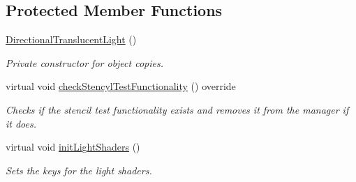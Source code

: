 \subsection*{Protected Member Functions}
\begin{DoxyCompactItemize}
\item 
\mbox{\label{class_geometry_engine_1_1_geometry_world_item_1_1_geometry_light_1_1_directional_translucent_light_a1814d77e9a240ad3492212f7397ebec2}} 
\mbox{\hyperlink{class_geometry_engine_1_1_geometry_world_item_1_1_geometry_light_1_1_directional_translucent_light_a1814d77e9a240ad3492212f7397ebec2}{Directional\+Translucent\+Light}} ()
\begin{DoxyCompactList}\small\item\em Private constructor for object copies. \end{DoxyCompactList}\item 
\mbox{\label{class_geometry_engine_1_1_geometry_world_item_1_1_geometry_light_1_1_directional_translucent_light_a0d5d778cb172daa3adae24578b626d5d}} 
virtual void \mbox{\hyperlink{class_geometry_engine_1_1_geometry_world_item_1_1_geometry_light_1_1_directional_translucent_light_a0d5d778cb172daa3adae24578b626d5d}{check\+Stencyl\+Test\+Functionality}} () override
\begin{DoxyCompactList}\small\item\em Checks if the stencil test functionality exists and removes it from the manager if it does. \end{DoxyCompactList}\item 
\mbox{\label{class_geometry_engine_1_1_geometry_world_item_1_1_geometry_light_1_1_directional_translucent_light_ae22f4e4c731ef204b7319fb9d2254df4}} 
virtual void \mbox{\hyperlink{class_geometry_engine_1_1_geometry_world_item_1_1_geometry_light_1_1_directional_translucent_light_ae22f4e4c731ef204b7319fb9d2254df4}{init\+Light\+Shaders}} ()
\begin{DoxyCompactList}\small\item\em Sets the keys for the light shaders. \end{DoxyCompactList}\item 

\end{DoxyCompactItemize}
